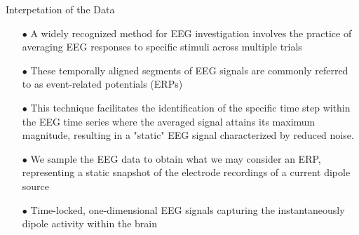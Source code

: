 \documentclass[aspectratio=169, 9pt]{beamer}
\begin{document}
\begin{frame}{Interpetation of the Data}
    \begin{itemize}
        \item[$\bullet$] A widely recognized method for EEG investigation involves the practice of averaging EEG responses to specific stimuli across multiple trials
        \item[$\bullet$] These temporally aligned segments of EEG signals are commonly referred to as event-related potentials (ERPs)
        \item[$\bullet$] This technique facilitates the identification of the specific time step within the EEG time series where the averaged signal attains its maximum magnitude, resulting in a "static" EEG signal characterized by reduced noise.
        \item[$\bullet$] We sample the EEG data to obtain what we may consider an ERP, representing a static snapshot of the electrode recordings of a current dipole source
        \item[$\bullet$] Time-locked, one-dimensional EEG signals capturing the instantaneously dipole activity within the brain
    \end{itemize}
\end{frame}
\end{document}
